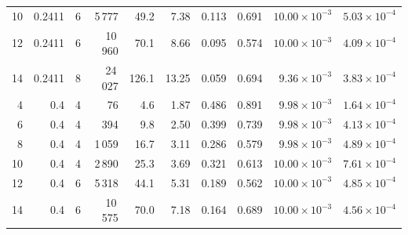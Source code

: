 \documentclass[11pt]{article}
\begin{document}
{\begin{longtable}{rrrrrrrrrr}
10 & 0.2411 & 6 & 5\,777 & 49.2 & 7.38 & 0.113 & 0.691 & $10.00\times10^{-3}$ & $5.03\times10^{-4}$ \\
12 & 0.2411 & 6 & 10\,960 & 70.1 & 8.66 & 0.095 & 0.574 & $10.00\times10^{-3}$ & $4.09\times10^{-4}$ \\
14 & 0.2411 & 8 & 24\,027 & 126.1 & 13.25 & 0.059 & 0.694 & $9.36\times10^{-3}$ & $3.83\times10^{-4}$ \\
4 & 0.4 & 4 & 76 & 4.6 & 1.87 & 0.486 & 0.891 & $9.98\times10^{-3}$ & $1.64\times10^{-4}$ \\
6 & 0.4 & 4 & 394 & 9.8 & 2.50 & 0.399 & 0.739 & $9.98\times10^{-3}$ & $4.13\times10^{-4}$ \\
8 & 0.4 & 4 & 1\,059 & 16.7 & 3.11 & 0.286 & 0.579 & $9.98\times10^{-3}$ & $4.89\times10^{-4}$ \\
10 & 0.4 & 4 & 2\,890 & 25.3 & 3.69 & 0.321 & 0.613 & $10.00\times10^{-3}$ & $7.61\times10^{-4}$ \\
12 & 0.4 & 6 & 5\,318 & 44.1 & 5.31 & 0.189 & 0.562 & $10.00\times10^{-3}$ & $4.85\times10^{-4}$ \\
14 & 0.4 & 6 & 10\,575 & 70.0 & 7.18 & 0.164 & 0.689 & $10.00\times10^{-3}$ & $4.56\times10^{-4}$ \\
\end{longtable}
}
\end{document}
